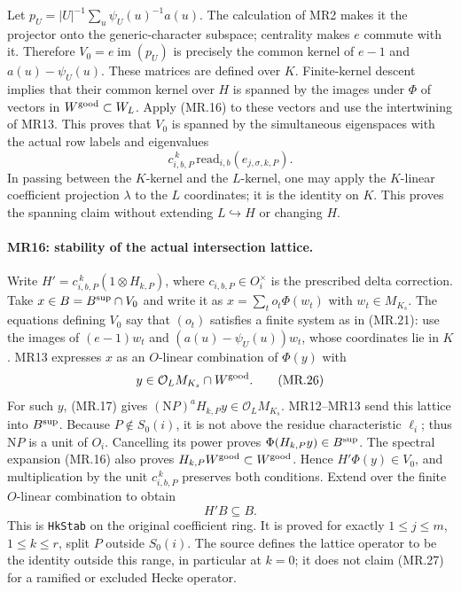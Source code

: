 Let $p_U=|U|^{-1}\sum_u\psi_U(u)^{-1}a(u)$. The calculation of
MR2 makes it the projector onto the generic-character subspace;
centrality makes $e$ commute with it. Therefore
$V_0=e\operatorname{im}(p_U)$ is precisely the common kernel of
$e-1$ and $a(u)-\psi_U(u)$. These matrices are defined over $K$.
Finite-kernel descent implies that their common kernel over $H$
is spanned by the images under $\Phi$ of vectors in
$W^{\rm good}\subset W_L$. Apply (MR.16) to these vectors and
use the intertwining of MR13. This proves that $V_0$ is spanned by
the simultaneous eigenspaces with the actual row labels and
eigenvalues
\[
           c_{i,b,P}^{\,k}\,
                  \mathrm{read}_{i,b}(e_{j,\sigma,k,P}).\tag{MR.25}
\]
In passing between the $K$-kernel and the $L$-kernel, one may apply
the $K$-linear coefficient projection $\lambda$ to the $L$
coordinates; it is the identity on $K$. This proves the spanning
claim without extending $L\hookrightarrow H$ or changing $H$.

\paragraph{MR16: stability of the actual intersection lattice.}
Write $H'=c_{i,b,P}^{\,k}(1\otimes H_{k,P})$, where
$c_{i,b,P}\in O_i^\times$ is the prescribed delta correction.
Take $x\in B=B^{\rm sup}\cap V_0$ and write it as
$x=\sum_t o_t\Phi(w_t)$ with $w_t\in M_{K_s}$.
The equations defining $V_0$ say that $(o_t)$ satisfies a finite
system as in (MR.21): use the images of
$(e-1)w_t$ and $(a(u)-\psi_U(u))w_t$, whose coordinates lie in $K$.
MR13 expresses $x$ as an $O$-linear combination of $\Phi(y)$ with
\[
          y\in\mathcal O_L M_{K_s}\cap W^{\rm good}.\tag{MR.26}
\]
For such $y$, (MR.17) gives
$(\mathrm N P)^aH_{k,P}y\in\mathcal O_LM_{K_s}$.
MR12--MR13 send this lattice into $B^{\rm sup}$. Because
$P\notin S_0(i)$, it is not above the residue characteristic
$\ell_i$; thus $\mathrm N P$ is a unit of $O_i$. Cancelling its
power proves $\Phi(H_{k,P}y)\in B^{\rm sup}$.
The spectral expansion (MR.16) also proves
$H_{k,P}W^{\rm good}\subset W^{\rm good}$.
Hence $H'\Phi(y)\in V_0$, and multiplication by the unit
$c_{i,b,P}^{\,k}$ preserves both conditions. Extend over the
finite $O$-linear combination to obtain
\[
                              H'B\subseteq B.        \tag{MR.27}
\]
This is \texttt{HkStab} on the original coefficient ring. It is
proved for exactly $1\le j\le m$, $1\le k\le r$, split $P$
outside $S_0(i)$. The source defines the lattice operator to be
the identity outside this range, in particular at $k=0$; it does
not claim (MR.27) for a ramified or excluded Hecke operator.

